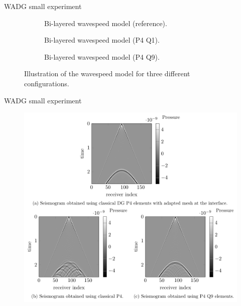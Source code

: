 \begin{frame}{WADG small experiment}

  \setlength{\modelwidth}{6.0cm}
\begin{figure}[htbp]
\begin{subfigure}{1.0\textwidth}
  \renewcommand{\modelfile}{image/num_exp_1/bicouche_model}
     \renewcommand{\cmapmin}{1500}
     \renewcommand{\cmapmax}{3000}
     \centering
     
     \caption{Bi-layered wavespeed model (reference).}
     \label{bicouche_model_with_mesh}
\end{subfigure}

\begin{subfigure}{0.45\textwidth}
  \renewcommand{\modelfile}{image/num_exp_1/bicouche_p4q1}
     \renewcommand{\cmapmin}{1500}
     \renewcommand{\cmapmax}{3000}
     \centering
     
     \caption{Bi-layered wavespeed model (P4 Q1).}
     \label{bicouche_model_without_mesh}
\end{subfigure}
\hspace{0.5cm}
\begin{subfigure}{0.45\textwidth}
  \renewcommand{\modelfile}{image/num_exp_1/bicouche_p4q9}
     \renewcommand{\cmapmin}{1500}
     \renewcommand{\cmapmax}{3000}
     \centering
     
     \caption{Bi-layered wavespeed model (P4 Q9).}
     \label{bicouche_model_with_wadg}
\end{subfigure}
\caption{Illustration of the wavespeed model for three different configurations.}
\label{bicouche_meshes}
\end{figure}
\end{frame}


\begin{frame}{WADG small experiment}
\vspace{-0.3cm}
\begin{figure}[htbp]
\includegraphics[scale=0.25]{image/flemme_wadg.png}
\end{figure}


\end{frame}



